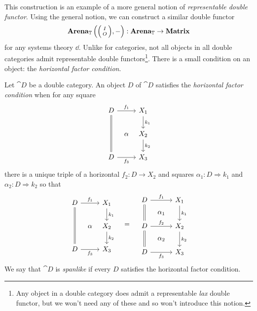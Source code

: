 \documentclass[DynamicalBook]{subfiles}
\begin{document}
This construction is an example of a more general notion of \emph{representable
  double functor}. Using the general notion, we can construct a similar double functor
$$\Cat{Arena}_{\dd}\left( \littlelens{I}{O}, - \right) : \Cat{Arena}_{\dd} \to
\Cat{Matrix}$$
for any systems theory $\dd$.
Unlike for categories, not all objects in all double
categories admit representable double functors\footnote{Any object in a double
  category does admit a representable \emph{lax} double functor, but we won't
  need any of these and so won't introduce this notion.}. There is a small
condition on an object: the \emph{horizontal factor condition}.
\begin{definition}\label{defn:spanlike}
  Let $\cat{D}$ be a double category. An object $D$ of $\cat{D}$ satisfies the
  \emph{horizontal factor condition} when for any square 
\[
        \begin{tikzcd}[column sep=tiny]
          D \ar[dd, equals] \ar[rr, "f_1"] & & X_1 \ar[d, "k_1"] \\
           & \alpha & X_2 \ar[d, "k_2"]\\
          D \ar[rr, "f_3"'] & & X_3
        \end{tikzcd}
        \]
  there is a unique triple of a horizontal $f_2 : D \to X_2$ and squares
  $\alpha_1 : D \Rightarrow k_1$ and $\alpha_2 : D \Rightarrow k_2$ so that
\[
        \begin{tikzcd}[column sep=tiny]
          D \ar[dd, equals] \ar[rr, "f_1"] & & X_1 \ar[d, "k_1"] \\
           & \alpha & X_2 \ar[d, "k_2"]\\
          D \ar[rr, "f_3"'] & & X_3
        \end{tikzcd}
        \quad=\quad
       \begin{tikzcd}[sep = tiny]
	D && {X_1} \\
	& {\alpha_1} \\
	D && {X_2} \\
	& {\alpha_2} \\
	D && {X_3}
	\arrow[from=1-1, to=3-1, equals]
	\arrow[from=3-1, to=5-1, equals]
	\arrow["{f_1}", from=1-1, to=1-3]
	\arrow["{f_2}", from=3-1, to=3-3]
	\arrow["{f_3}"', from=5-1, to=5-3]
	\arrow["{k_1}", from=1-3, to=3-3]
	\arrow["{k_2}", from=3-3, to=5-3]
\end{tikzcd} 
\]
 We say that $\cat{D}$ is \emph{spanlike} if every $D$ satisfies the horizontal
 factor condition. 
\end{definition}
\end{document}
